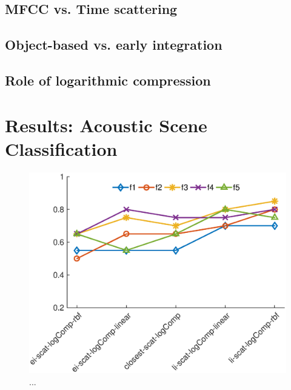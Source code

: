 \documentclass[journal]{IEEEtran}
\makeatletter
\newcommand*{\vs}{vs.\@\xspace}
\makeatother
\begin{document}
\subsection{MFCC \vs Time scattering}

\subsection{Object-based \vs early integration}

\subsection{Role of logarithmic compression}


\section{Results: Acoustic Scene Classification}


\begin{figure}
\begin{center}
\includegraphics[width=\columnwidth]{gfx/supervised_linear_test1.eps}
\caption{...}
\end{center}
\end{figure}
\end{document}
